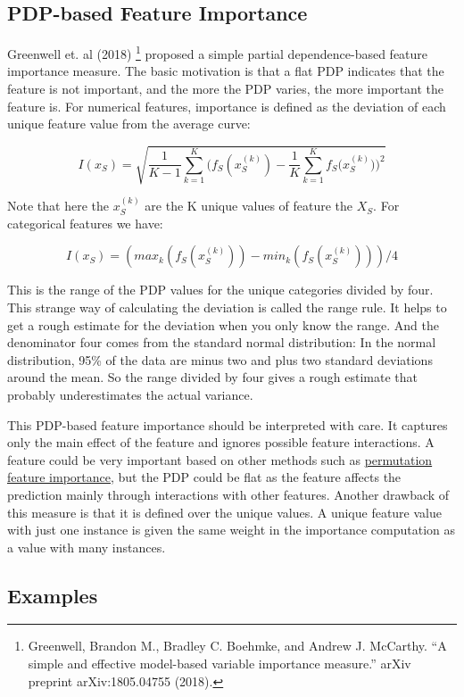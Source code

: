 \documentclass[12pt,]{krantz}
\begin{document}
\subsection{PDP-based Feature
Importance}\label{pdp-based-feature-importance}

Greenwell et. al (2018) \footnote{Greenwell, Brandon M., Bradley C.
  Boehmke, and Andrew J. McCarthy. ``A simple and effective model-based
  variable importance measure.'' arXiv preprint arXiv:1805.04755 (2018).}
proposed a simple partial dependence-based feature importance measure.
The basic motivation is that a flat PDP indicates that the feature is
not important, and the more the PDP varies, the more important the
feature is. For numerical features, importance is defined as the
deviation of each unique feature value from the average curve:

\[I(x_S) =  \sqrt{\frac{1}{K-1}\sum_{k=1}^K(f_S(x^{(k)}_S) - \frac{1}{K}\sum_{k=1}^K f_S({x^{(k)}_S))^2}}\]

Note that here the \(x^{(k)}_S\) are the K unique values of feature the
\(X_S\). For categorical features we have:

\[I(x_S) = (max_k(f_S(x^{(k)}_S)) - min_k(f_S(x^{(k)}_S)))/4\]

This is the range of the PDP values for the unique categories divided by
four. This strange way of calculating the deviation is called the range
rule. It helps to get a rough estimate for the deviation when you only
know the range. And the denominator four comes from the standard normal
distribution: In the normal distribution, 95\% of the data are minus two
and plus two standard deviations around the mean. So the range divided
by four gives a rough estimate that probably underestimates the actual
variance.

This PDP-based feature importance should be interpreted with care. It
captures only the main effect of the feature and ignores possible
feature interactions. A feature could be very important based on other
methods such as \protect\hyperlink{feature-importance}{permutation
feature importance}, but the PDP could be flat as the feature affects
the prediction mainly through interactions with other features. Another
drawback of this measure is that it is defined over the unique values. A
unique feature value with just one instance is given the same weight in
the importance computation as a value with many instances.

\subsection{Examples}\label{examples}
\end{document}
